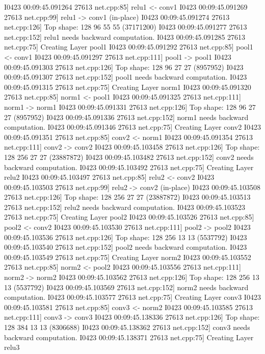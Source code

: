 \documentclass{article}
\begin{document}
I0423 00:09:45.091264 27613 net.cpp:85] relu1 <- conv1
I0423 00:09:45.091269 27613 net.cpp:99] relu1 -> conv1 (in-place)
I0423 00:09:45.091274 27613 net.cpp:126] Top shape: 128 96 55 55 (37171200)
I0423 00:09:45.091277 27613 net.cpp:152] relu1 needs backward computation.
I0423 00:09:45.091285 27613 net.cpp:75] Creating Layer pool1
I0423 00:09:45.091292 27613 net.cpp:85] pool1 <- conv1
I0423 00:09:45.091297 27613 net.cpp:111] pool1 -> pool1
I0423 00:09:45.091303 27613 net.cpp:126] Top shape: 128 96 27 27 (8957952)
I0423 00:09:45.091307 27613 net.cpp:152] pool1 needs backward computation.
I0423 00:09:45.091315 27613 net.cpp:75] Creating Layer norm1
I0423 00:09:45.091320 27613 net.cpp:85] norm1 <- pool1
I0423 00:09:45.091325 27613 net.cpp:111] norm1 -> norm1
I0423 00:09:45.091331 27613 net.cpp:126] Top shape: 128 96 27 27 (8957952)
I0423 00:09:45.091336 27613 net.cpp:152] norm1 needs backward computation.
I0423 00:09:45.091346 27613 net.cpp:75] Creating Layer conv2
I0423 00:09:45.091351 27613 net.cpp:85] conv2 <- norm1
I0423 00:09:45.091354 27613 net.cpp:111] conv2 -> conv2
I0423 00:09:45.103458 27613 net.cpp:126] Top shape: 128 256 27 27 (23887872)
I0423 00:09:45.103482 27613 net.cpp:152] conv2 needs backward computation.
I0423 00:09:45.103492 27613 net.cpp:75] Creating Layer relu2
I0423 00:09:45.103497 27613 net.cpp:85] relu2 <- conv2
I0423 00:09:45.103503 27613 net.cpp:99] relu2 -> conv2 (in-place)
I0423 00:09:45.103508 27613 net.cpp:126] Top shape: 128 256 27 27 (23887872)
I0423 00:09:45.103513 27613 net.cpp:152] relu2 needs backward computation.
I0423 00:09:45.103523 27613 net.cpp:75] Creating Layer pool2
I0423 00:09:45.103526 27613 net.cpp:85] pool2 <- conv2
I0423 00:09:45.103530 27613 net.cpp:111] pool2 -> pool2
I0423 00:09:45.103536 27613 net.cpp:126] Top shape: 128 256 13 13 (5537792)
I0423 00:09:45.103540 27613 net.cpp:152] pool2 needs backward computation.
I0423 00:09:45.103549 27613 net.cpp:75] Creating Layer norm2
I0423 00:09:45.103552 27613 net.cpp:85] norm2 <- pool2
I0423 00:09:45.103556 27613 net.cpp:111] norm2 -> norm2
I0423 00:09:45.103562 27613 net.cpp:126] Top shape: 128 256 13 13 (5537792)
I0423 00:09:45.103569 27613 net.cpp:152] norm2 needs backward computation.
I0423 00:09:45.103577 27613 net.cpp:75] Creating Layer conv3
I0423 00:09:45.103581 27613 net.cpp:85] conv3 <- norm2
I0423 00:09:45.103585 27613 net.cpp:111] conv3 -> conv3
I0423 00:09:45.138336 27613 net.cpp:126] Top shape: 128 384 13 13 (8306688)
I0423 00:09:45.138362 27613 net.cpp:152] conv3 needs backward computation.
I0423 00:09:45.138371 27613 net.cpp:75] Creating Layer relu3
\end{document}
